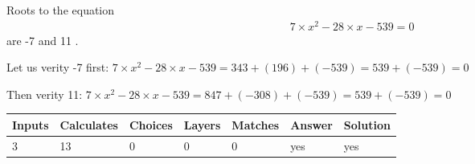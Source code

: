 \documentclass[12pt]{article}
\begin{document}
 

 
 
 
\noindent{}
 
 

Roots to the equation
\begin{eqnarray*}
7 \times x^2  %
-28
                 \times x    %
-539 =0
\end{eqnarray*}
are  %
-7 and  %
11 .
 
Let us verity  %
-7 first:
$  %
7 \times x^2  %
-28
                 \times x    %
-539
  = %
343+( %
196)+( %
-539)
  = %
539+( %
-539)
  = %
0
$
 
Then verity  %
11:
$  %
7 \times x^2  %
-28
                 \times x    %
-539
  = %
847+( %
-308)+( %
-539)
  = %
539+( %
-539)
  = %
0
$
 
 
 
\noindent{}
 
 

 
\vspace{0.3in}
   
   
   
   
\noindent\begin{tabular}{|l|l|l|l|l|l|l|}
 \hline
Inputs & Calculates & Choices & Layers & Matches & Answer & Solution \\ \hline
           3 & 
          13 & 
           0
  & 
           0 & 
           0 & 
  yes & 
  yes 
  \\ \hline
 \end{tabular}
   
   
   
   
\noindent{}
   
   
  
\end{document}
